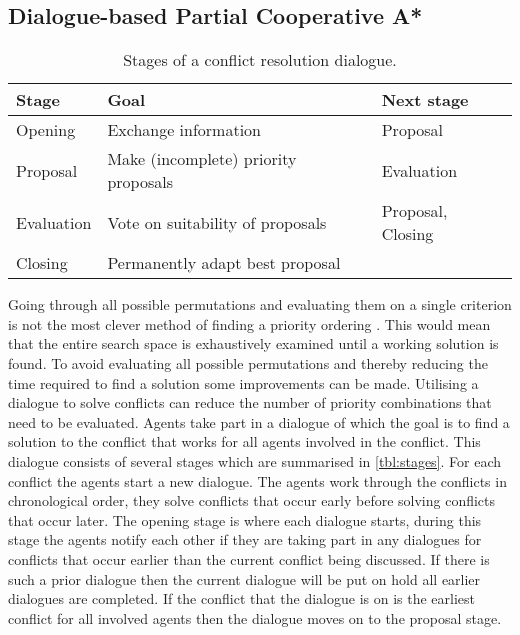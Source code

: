 \subsection{Dialogue-based Partial Cooperative A*}
\begin{table}
    \centering
    \caption{Stages of a conflict resolution dialogue.}
    \label{tbl:stages}
    \begin{tabular}{l|l|l}
        Stage & Goal & Next stage \\ \hline
        Opening & Exchange information & Proposal \\
        Proposal & Make (incomplete) priority proposals & Evaluation \\
        Evaluation & Vote on suitability of proposals & Proposal, Closing \\
        Closing & Permanently adapt best proposal & \\
    \end{tabular}
\end{table}

Going through all possible permutations and evaluating them on a single
criterion is not the most clever method of finding a priority ordering
\cite{bennewitz2002}. This would mean that the entire search space is
exhaustively examined until a working solution is found. To avoid evaluating
all possible permutations and thereby reducing the time required to find a
solution some improvements can be made. Utilising a dialogue to solve conflicts
can reduce the number of priority combinations that need to be evaluated.
Agents take part in a dialogue of which the goal is to find a solution to the
conflict that works for all agents involved in the conflict. This dialogue
consists of several stages which are summarised in \autoref{tbl:stages}. For
each conflict the agents start a new dialogue. The agents work through the
conflicts in chronological order, they solve conflicts that occur early before
solving conflicts that occur later. The opening stage is where each dialogue
starts, during this stage the agents notify each other if they are taking part
in any dialogues for conflicts that occur earlier than the current conflict
being discussed. If there is such a prior dialogue then the current dialogue
will be put on hold all earlier dialogues are completed. If the conflict that
the dialogue is on is the earliest conflict for all involved agents then the
dialogue moves on to the proposal stage.

